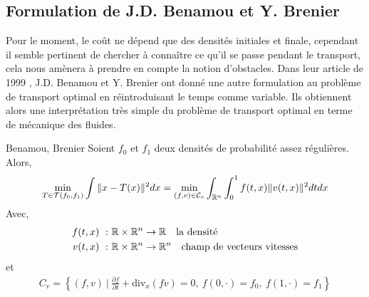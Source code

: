 \documentclass[a4paper,12pt]{article}
\begin{document}
\subsection{Formulation de J.D. Benamou et Y. Brenier}
Pour le moment, le coût ne dépend que des densités initiales et finale, cependant il semble pertinent de chercher à connaître ce qu'il se passe pendant le transport, cela nous amènera à prendre en compte la notion d'obstacles. 
Dans leur article de 1999 \cite{benamoubrenier}, J.D. Benamou et Y. Brenier ont donné une autre formulation au problème de transport optimal en réintroduisant le temps comme variable. Ils obtiennent alors une interprétation très simple du problème de transport optimal en terme de mécanique des fluides. 

\begin{theoreme}{Benamou, Brenier}
Soient $f_0$ et $f_1$ deux densités de probabilité assez régulières. Alors, 
\begin{align}
\min_{T\in\mathcal{T}(f_0,f_1)} \int\|x-T(x)\|^2dx =\min_{(f,v)\in\mathcal{C}_v}\int_{\mathbb{R}^n}\int_0^1 f(t,x)\|v(t,x)\|^2dtdx
\end{align}
Avec,
\begin{align*}
f(t,x)\ :&\ \mathbb{R}\times\mathbb{R}^n\rightarrow \mathbb{R} \quad \text{la densité}\\
v(t,x)\ :&\ \mathbb{R}\times\mathbb{R}^n\rightarrow \mathbb{R}^n \quad \text{champ de vecteurs vitesses}
\end{align*}
et 
\begin{align}
C_v=\left\{(f,v)\ |\ \frac{\partial f}{\partial t} + \text{div}_x (fv) =0,\ f(0,\cdot) = f_0,\ f(1,\cdot)=f_1 \right\}
\label{eq:contraintes}
\end{align}
\end{theoreme}
\end{document}
